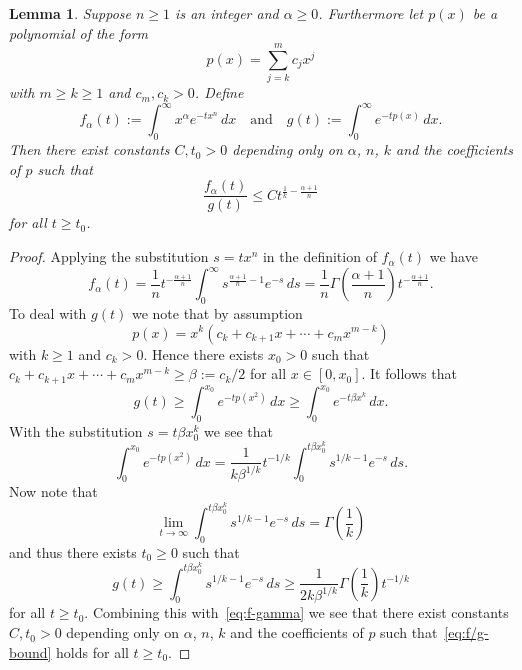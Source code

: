 \documentclass[a4paper, reqno]{amsart}
\numberwithin{equation}{section}
\theoremstyle{plain}
\newtheorem{lemma}[theorem]{Lemma}
\theoremstyle{definition}
\theoremstyle{remark}
\begin{document}
\begin{lemma}
  \label{lem:f/g-lim}
  Suppose $n \geq 1$ is an integer and $\alpha\geq 0$. Furthermore let $p(x)$ be a polynomial of the form
  \begin{equation*}
    p(x) = \sum_{j=k}^m c_j x^{j}
  \end{equation*}
  with $m\geq k\geq 1$ and $c_m,c_k>0$. Define
  \begin{equation}
    f_\alpha(t) := \int_0^\infty x^\alpha e^{-tx^n} \,dx
    \quad\text{and}\quad
    g(t) := \int_0^\infty e^{-tp(x)} \,dx.
  \end{equation}
  Then there exist constants $C,t_0>0$ depending only on $\alpha$, $n$, $k$ and the coefficients of $p$ such that
  \begin{equation}
    \label{eq:f/g-bound}
    \frac{f_\alpha(t)}{g(t)}
    \leq Ct^{\frac{1}{k}-\frac{\alpha + 1}{n}}
  \end{equation}
  for all $t\geq t_0$.
\end{lemma}
\begin{proof}
  Applying the substitution $s=tx^n$ in the definition of $f_\alpha(t)$ we have
  \begin{equation}
    \label{eq:f-gamma}
    f_\alpha(t)
    = \frac{1}{n}t^{-\frac{\alpha+1}{n}}\int_0^\infty s^{\frac{\alpha+1}{n}-1}e^{-s}\,ds
    = \frac{1}{n}\Gamma\left(\frac{\alpha+1}{n}\right)t^{-\frac{\alpha+1}{n}}.
  \end{equation}
  To deal with $g(t)$ we note that by assumption
  \begin{equation*}
    p(x)=x^k(c_k+c_{k+1}x+\cdots+c_mx^{m-k})
  \end{equation*}
  with $k\geq 1$ and $c_k>0$. Hence there exists $x_0>0$ such that $c_k+c_{k+1}x+\cdots+c_mx^{m-k}\geq \beta:=c_k/2$ for all $x\in[0,x_0]$. It follows that
  \begin{equation*}
    g(t) \geq \int_0^{x_0} e^{-tp(x^2)} \,dx
    \geq \int_0^{x_0}e^{-t\beta x^k}\,dx.
  \end{equation*}
  With the substitution $s=t\beta x_0^k$ we see that
  \begin{equation*}
    \int_0^{x_0}e^{-tp(x^2)} \,dx
    =\frac{1}{k\beta^{1/k}}t^{-1/k}
    \int_0^{t\beta x_0^k}s^{1/k-1}e^{-s}\,ds.
  \end{equation*}
  Now note that
  \begin{equation*}
    \lim_{t\to\infty}\int_0^{t\beta x_0^k}s^{1/k-1}e^{-s}\,ds
    =\Gamma\left(\frac{1}{k}\right)
  \end{equation*}
  and thus there exists $t_0\geq 0$ such that
  \begin{equation*}
    g(t)\geq \int_0^{t\beta x_0^k}s^{1/k-1}e^{-s}\,ds
    \geq\frac{1}{2k\beta^{1/k}}\Gamma\left(\frac{1}{k}\right)t^{-1/k}
  \end{equation*}
  for all $t\geq t_0$. Combining this with~\eqref{eq:f-gamma} we see that there exist constants $C, t_0>0$ depending only on $\alpha$, $n$, $k$ and the coefficients of $p$ such that~\eqref{eq:f/g-bound} holds for all $t\geq t_0$.
\end{proof}
\end{document}
